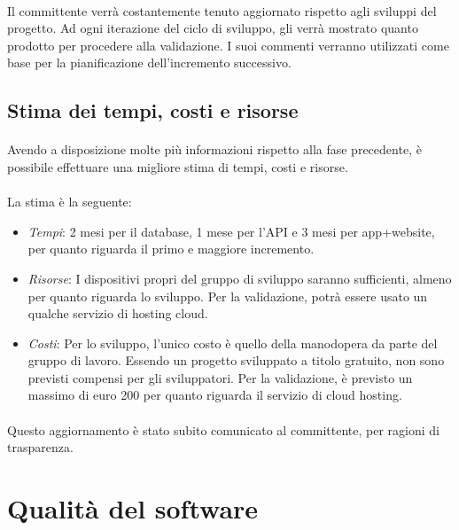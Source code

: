 \documentclass[11pt,a4paper,english]{article}
\begin{document}
\paragraph{} Il committente verrà costantemente tenuto aggiornato rispetto agli sviluppi del progetto. Ad ogni iterazione del ciclo di sviluppo, gli verrà mostrato quanto prodotto per procedere alla validazione. I suoi commenti verranno utilizzati come base per la pianificazione dell'incremento successivo.

\subsection{Stima dei tempi, costi e risorse}

\paragraph{} Avendo a disposizione molte più informazioni rispetto alla fase precedente, è possibile effettuare una migliore stima di tempi, costi e risorse. 

\paragraph{} La stima è la seguente:
\begin{itemize}
    \item \emph{Tempi}: 2 mesi per il database, 1 mese per l'API e 3 mesi per app+website, per quanto riguarda il primo e maggiore incremento. 
    \item \emph{Risorse}: I dispositivi propri del gruppo di sviluppo saranno sufficienti, almeno per quanto riguarda lo sviluppo. Per la validazione, potrà essere usato un qualche servizio di hosting cloud.
    \item \emph{Costi}: Per lo sviluppo, l'unico costo è quello della manodopera da parte del gruppo di lavoro. Essendo un progetto sviluppato a titolo gratuito, non sono previsti compensi per gli sviluppatori. Per la validazione, è previsto un massimo di euro 200 per quanto riguarda il servizio di cloud hosting. 
\end{itemize}

\paragraph{} Questo aggiornamento è stato subito comunicato al committente, per ragioni di trasparenza. 


\section{Qualità del software}
\end{document}
